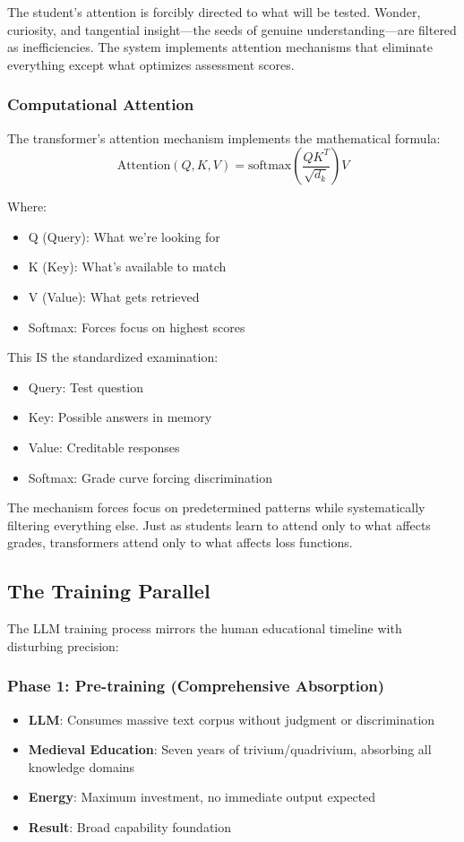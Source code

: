 The student's attention is forcibly directed to what will be tested. Wonder, curiosity, and tangential insight---the seeds of genuine understanding---are filtered as inefficiencies. The system implements attention mechanisms that eliminate everything except what optimizes assessment scores.

\subsubsection{Computational Attention}

The transformer's attention mechanism implements the mathematical formula:
\begin{equation}
\text{Attention}(Q,K,V) = \text{softmax}\left(\frac{QK^T}{\sqrt{d_k}}\right)V
\end{equation}

Where:
\begin{itemize}
\item Q (Query): What we're looking for
\item K (Key): What's available to match
\item V (Value): What gets retrieved
\item Softmax: Forces focus on highest scores
\end{itemize}

This IS the standardized examination:
\begin{itemize}
\item Query: Test question
\item Key: Possible answers in memory
\item Value: Creditable responses
\item Softmax: Grade curve forcing discrimination
\end{itemize}

The mechanism forces focus on predetermined patterns while systematically filtering everything else. Just as students learn to attend only to what affects grades, transformers attend only to what affects loss functions.

\subsection{The Training Parallel}

The LLM training process mirrors the human educational timeline with disturbing precision:

\subsubsection{Phase 1: Pre-training (Comprehensive Absorption)}
\begin{itemize}
\item \textbf{LLM}: Consumes massive text corpus without judgment or discrimination
\item \textbf{Medieval Education}: Seven years of trivium/quadrivium, absorbing all knowledge domains
\item \textbf{Energy}: Maximum investment, no immediate output expected
\item \textbf{Result}: Broad capability foundation
\end{itemize}

